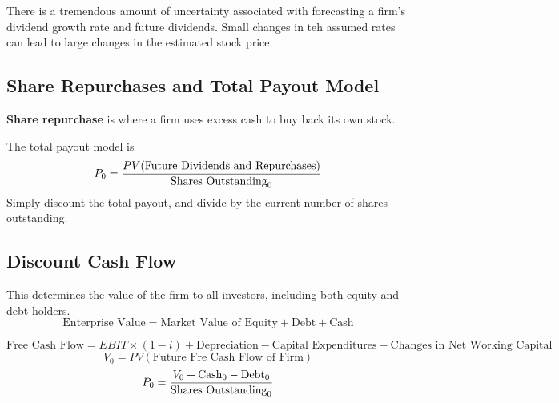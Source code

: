 \documentclass[english, 12pt]{article}
\begin{document}
\begin{note}
There is a tremendous amount of uncertainty associated with forecasting a firm's dividend growth rate and future dividends. Small changes in teh assumed rates can lead to large changes in the estimated stock price.
\end{note}

\subsection{Share Repurchases and Total Payout Model}

\begin{defn}
\textbf{Share repurchase} is where a firm uses excess cash to buy back its own stock.
\end{defn}
The total payout model is
\[P_0 = \frac{PV(\text{Future Dividends and Repurchases})}{\text{Shares Outstanding}_0}\]
Simply discount the total payout, and divide by the current number of shares outstanding.

\subsection{Discount Cash Flow}
This determines the value of the firm to all investors, including both equity and debt holders.
\[\text{Enterprise Value} = \text{Market Value of Equity} + \text{Debt} + \text{Cash}\]

\[\text{Free Cash Flow} = EBIT \times (1 - i) + \text{Depreciation} - \text{Capital Expenditures} - \text{Changes in Net Working Capital}\]
\[V_0 = PV(\text{Future Fre Cash Flow of Firm})\]
\[P_0 = \frac{V_0 + \text{Cash}_0 - \text{Debt}_0}{\text{Shares Outstanding}_0}\]
\end{document}
